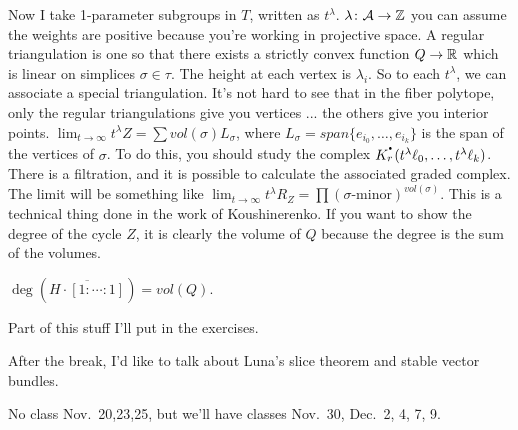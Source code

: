 Now I take 1-parameter subgroups in $T$, written as $t^\lambda$. $\lambda\colon \mathcal A\to \mathbb{Z}$ you can assume the weights are positive because you're working in projective space. A regular triangulation is one so that there exists a strictly convex function $Q\to \mathbb{R}$ which is linear on simplices $\sigma\in \tau$. The height at each vertex is $\lambda_i$. So to each $t^\lambda$, we can associate a special triangulation. It's not hard to see that in the fiber polytope, only the regular triangulations give you vertices ... the others give you interior points. $\lim_{t\to \infty}t^\lambda Z=\sum vol(\sigma)L_\sigma$, where $L_\sigma=span\{e_{i_0},\dots, e_{i_k}\}$ is the span of the vertices of $\sigma$. To do this, you should study the complex $K^\udot_r(t^\lambda\ell_0,\dots, t^\lambda \ell_k)$. There is a filtration, and it is possible to calculate the associated graded complex. The limit will be something like $\lim_{t\to \infty} t^\lambda R_Z = \prod (\sigma\text{-minor})^{vol(\sigma)}$. This is a technical thing done in the work of Koushinerenko. If you want to show the degree of the cycle $Z$, it is clearly the volume of $Q$ because the degree is the sum of the volumes.
\begin{corollary}
 $\deg(\overline{H\cdot [1:\cdots :1]})=vol(Q)$.
\end{corollary}
Part of this stuff I'll put in the exercises.

After the break, I'd like to talk about Luna's slice theorem and stable vector bundles.

No class Nov.~20,23,25, but we'll have classes Nov.~30, Dec.~2, 4, 7, 9.